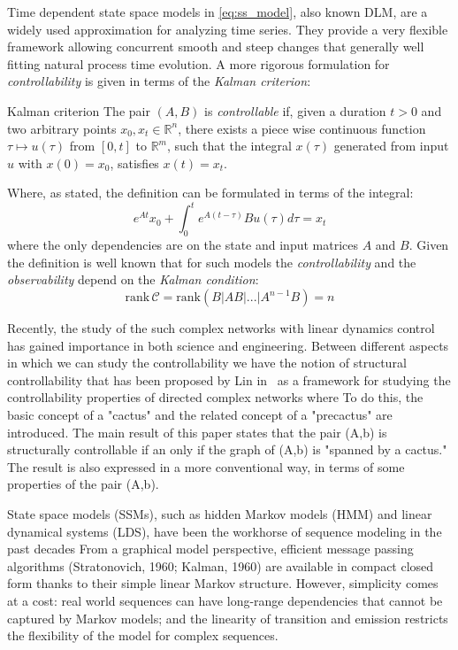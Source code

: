 Time dependent state space models in \eqref{eq:ss_model}, also known \acl{DLM}, are a widely used approximation for analyzing time series. They provide a very flexible framework allowing concurrent smooth and steep changes that generally well fitting natural process time evolution.
A more rigorous formulation for \textit{controllability} is given in terms of the \textit{Kalman criterion}:
\begin{definition}{Kalman criterion}
The pair $(A,B)$ is \textit{controllable} if, given a duration $t>0$ and two arbitrary points $x_0, x_t \in \mathbb{R}^n$, there exists a piece wise continuous function $\tau \mapsto u(\tau)$ from $[0,t]$ to $\mathbb{R}^m$, such that the integral $x(\tau)$ generated from input $u$ with $x(0) = x_0$, satisfies $x(t)=x_t$.
\end{definition}
Where, as stated, the definition can be formulated in terms of the integral:
\begin{equation}
    e^{A t}x_0 + \int_0^t e^{A(t-\tau)}B u(\tau) d\tau = x_t
\end{equation}
where the only dependencies are on the state and input matrices $A$ and $B$.
Given the definition is well known that for such models the \textit{controllability} and the \textit{observability} depend on the \textit{Kalman condition}:
\begin{equation}
    \mathrm{rank}\,\mathscr{C} = \mathrm{rank}\left( B|AB|...|A^{n-1}B \right) = n
\end{equation}

Recently, the study of the such complex networks with linear dynamics control has gained importance in both science and engineering. Between different aspects in which we can study the controllability we have the notion of structural controllability that has been proposed by Lin in~\cite{1100557} as a framework for studying the controllability properties of directed complex networks where
To do this, the basic concept of a "cactus" and the related concept of a "precactus" are introduced. The main result of this paper states that the pair (A,b) is structurally controllable if an only if the graph of (A,b) is "spanned by a cactus." The result is also expressed in a more conventional way, in terms of some properties of the pair (A,b).




State space models (SSMs), such as hidden Markov models (HMM) and linear dynamical systems
(LDS), have been the workhorse of sequence modeling in the past decades From a graphical model
perspective, efficient message passing algorithms (Stratonovich, 1960; Kalman, 1960) are available
in compact closed form thanks to their simple linear Markov structure. However, simplicity comes
at a cost: real world sequences can have long-range dependencies that cannot be captured by Markov
models; and the linearity of transition and emission restricts the flexibility of the model for complex
sequences.

